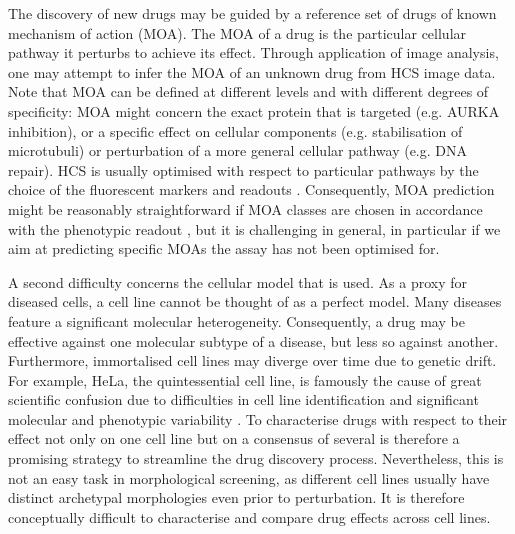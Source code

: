 The discovery of new drugs may be guided by a reference set of drugs of known mechanism of action (MOA). The MOA of a drug is the particular cellular pathway it perturbs to achieve its effect. Through application of image analysis, one may attempt to infer the MOA of an unknown drug from HCS image data. Note that MOA can be defined at different levels and with different degrees of specificity: MOA might concern the exact protein that is targeted (e.g. AURKA inhibition), or a specific effect on cellular components (e.g. stabilisation of microtubuli) or perturbation of a more general cellular pathway (e.g. DNA repair). HCS is usually optimised with respect to particular pathways by the choice of the fluorescent markers and readouts {\cite{pepperkok2006}}. {Consequently, MOA prediction might be reasonably straightforward if MOA classes are chosen in accordance with the phenotypic readout \cite{ljosa2013comparison}}, but it is challenging in general, in particular if we aim at predicting specific MOAs the assay has not been optimised for.




A second difficulty concerns the cellular model that is used. As a proxy for diseased cells, a cell line cannot be thought of as a perfect model. Many diseases feature a significant molecular heterogeneity. Consequently, a drug may be effective against one molecular subtype of a disease, but less so against another. Furthermore, immortalised cell lines may diverge over time due to genetic drift. For example, HeLa, the quintessential cell line, is famously the cause of great scientific confusion {due to difficulties in cell line identification \cite{horbach2017ghosts} and significant molecular and phenotypic variability \cite{liu2019multi}}. To characterise drugs with respect to their effect not only on one cell line but on a consensus of several is therefore a promising strategy to streamline the drug discovery process. Nevertheless, this is not an easy task in morphological screening, as different cell lines usually have distinct archetypal morphologies even prior to perturbation. It is therefore conceptually difficult to characterise and compare drug effects across cell lines.


